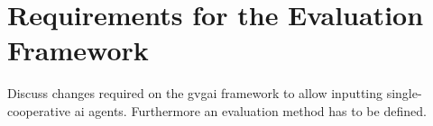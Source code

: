 \section{Requirements for the Evaluation Framework}\label{s:requirements}
Discuss changes required on the \ac{gvgai} framework to allow inputting single-cooperative \ac{ai} agents. Furthermore an evaluation method has to be defined.